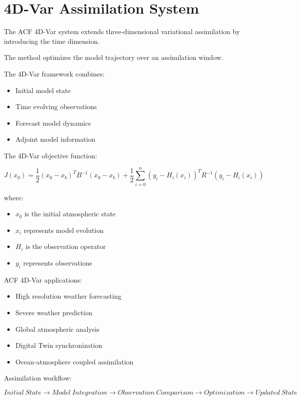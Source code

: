 \section{4D-Var Assimilation System}



The ACF 4D-Var system extends three-dimensional variational
assimilation by introducing the time dimension.



The method optimizes the model trajectory over an assimilation
window.



The 4D-Var framework combines:


\begin{itemize}

\item Initial model state

\item Time evolving observations

\item Forecast model dynamics

\item Adjoint model information

\end{itemize}



The 4D-Var objective function:


\[
J(x_0)=
\frac{1}{2}(x_0-x_b)^TB^{-1}(x_0-x_b)
+
\frac{1}{2}
\sum_{i=0}^{n}
(y_i-H_i(x_i))^TR^{-1}
(y_i-H_i(x_i))
\]



where:


\begin{itemize}

\item $x_0$ is the initial atmospheric state

\item $x_i$ represents model evolution

\item $H_i$ is the observation operator

\item $y_i$ represents observations

\end{itemize}



ACF 4D-Var applications:


\begin{itemize}

\item High resolution weather forecasting

\item Severe weather prediction

\item Global atmospheric analysis

\item Digital Twin synchronization

\item Ocean-atmosphere coupled assimilation

\end{itemize}



Assimilation workflow:


\[
Initial\ State
\rightarrow
Model\ Integration
\rightarrow
Observation\ Comparison
\rightarrow
Optimization
\rightarrow
Updated\ State
\]
